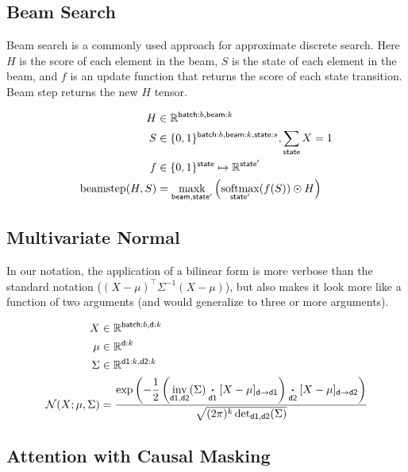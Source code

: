 \documentclass{article}
\newcommand{\name}[1]{\mathsf{#1}}
\newcommand{\ndot}[1]{\mathbin{\mathop{\thinspace\boldsymbol\cdot\thinspace}\displaylimits_{\name{#1}}}}
\newcommand{\nsum}[1]{\mathop{\sum}_{\name{#1}}}
\newcommand{\nfun}[2]{\mathop{\text{#2}}\displaylimits_{\name{#1}}}
\newcommand{\reals}{\mathbb{R}}
\begin{document}
\subsection{Beam Search}

Beam search is a commonly used approach for approximate discrete search. Here $H$ is the score of each element in the beam, $S$ is the state of each element in the beam, and $f$ is an update function that returns the score of each state transition. 
Beam step returns the new $H$ tensor. 

\begin{align*} 
H &\in \reals^{{ \name{batch}:b, \name{beam}:k}} \\
S &\in \{0, 1\}^{{ \name{batch}:b, \name{beam}:k, \name{state}:s}}, \nsum{state} X = 1\\
f &\in \{0, 1\}^{{\name{state}}} \mapsto \reals^{{\name{state'}}} \\ 
\text{beamstep}(H, S) &=  \nfun{beam, state'}{maxk} \left( \nfun{state'}{softmax}(f(S)) \odot H  \right)
\end{align*} 

\subsection{Multivariate Normal}

In our notation, the application of a bilinear form is more verbose than the standard notation ($(X-\mu)^\top \Sigma^{-1} (X-\mu)$), but also makes it look more like a function of two arguments (and would generalize to three or more arguments).

\begin{align*} 
X &\in \reals^{\name{batch}:{b}, \name{d}:{k}}  \\
\mu &\in \reals^{{\name{d}:{k}}}  \\
\Sigma & \in   \reals^{{\name{d1}:{k}, \name{d2}:{k}}}  \\
{\cal N}(X; \mu, \Sigma) &= \frac{\displaystyle \exp\left(-\frac{1}{2}  \left(\nfun{d1, d2}{\text{inv}}(\Sigma) \ndot{d1} [X - \mu]_{\name{d} \rightarrow \name{d1}} \right) \ndot{d2} [X - \mu]_{\name{d} \rightarrow \name{d2}} \right) }{\sqrt{(2 \pi)^k \nfun{d1, d2}{\text{det}}(\Sigma)} }
\end{align*}


\subsection{Attention with Causal Masking}
\end{document}
